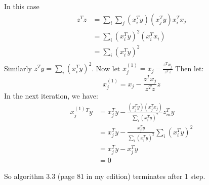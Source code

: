 In this case 
\begin{align*}
    z^T z &= \sum_i \sum_j \left(x_i^T y\right)\left(x_j^T y\right) x_i^T x_j\\
    &= \sum_i \left(x_i^T y\right)^2 \left(x_i^T x_i\right)\\
    &= \sum_i \left(x_i^T y\right)^2\\
\end{align*}
Similarly $z^T y = \sum_i \left(x_i^T y\right)^2$. Now let $x_j^{(1)} = x_j - \frac{z^T x_j}{z^T z}$
Then let:
$$ x_j^{(1)} = x_j - \frac{z^T x_j}{ z^T z}z$$
In the next iteration, we have:
\begin{align*}
    x_j^{(1)}^T y &= x_j^T y - \frac{\left(x_j^T y\right) \left(x_j^T x_j\right)}{ \sum_i \left(x_i^T y\right)^2}z_m^T y\\
     &= x_j^T y - \frac{x_j^T y }{ \sum_i \left(x_i^T y\right)^2 }\sum_i \left(x_i^T y\right)^2\\
    &= x_j^T y - x_j^T y\\
    &= 0
\end{align*}

So algorithm 3.3 (page 81 in my edition) terminates after 1 step.